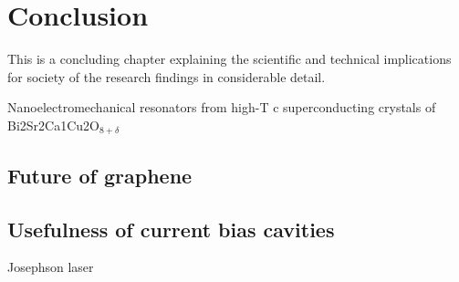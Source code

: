 \chapter{Conclusion}
\label{conclusion}

This is a concluding chapter explaining the scientific and technical
implications for society of the research findings in considerable detail.

Nanoelectromechanical resonators from high-T c superconducting crystals of Bi2Sr2Ca1Cu2O$_{8+\delta}$

\section{Future of graphene}



\section{Usefulness of current bias cavities}

Josephson laser
